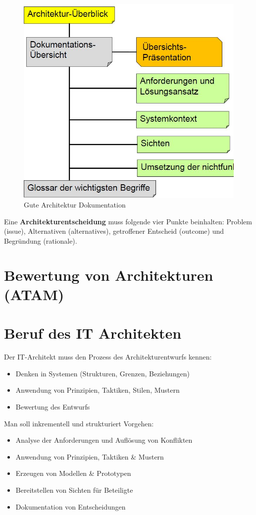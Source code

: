 \begin{figure}[h!]
\centering
\includegraphics[width=0.5\linewidth]{fig/gute-architektur-dokumentation}
\caption{Gute Architektur Dokumentation}
\label{fig:gute-architektur-dokumentation}
\end{figure}

Eine \textbf{Architekturentscheidung} muss folgende vier Punkte beinhalten: Problem (issue), Alternativen (alternatives), getroffener Entscheid (outcome) und Begründung (rationale). 



\section{Bewertung von Architekturen (ATAM)}

\section{Beruf des IT Architekten}

Der IT-Architekt muss den Prozess des Architekturentwurfs kennen:

\begin{itemize}
	\item Denken in Systemen (Strukturen, Grenzen, Beziehungen)
	\item Anwendung von Prinzipien, Taktiken, Stilen, Mustern
	\item Bewertung des Entwurfs
\end{itemize}

Man soll inkrementell und strukturiert Vorgehen:

\begin{itemize}
	\item Analyse der Anforderungen und Auflösung von Konflikten
	\item Anwendung von Prinzipien, Taktiken \& Mustern
	\item Erzeugen von Modellen \& Prototypen
	\item Bereitstellen von Sichten für Beteiligte
	\item Dokumentation von Entscheidungen
\end{itemize}

